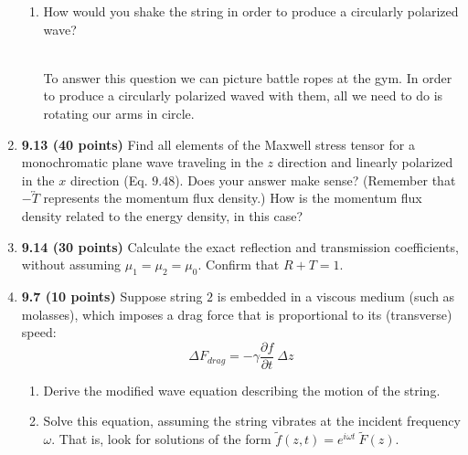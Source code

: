 \documentclass[fleqn]{article}
\begin{document}
\begin{enumerate}
\begin{enumerate}
      \item How would you shake the string in order to produce a circularly polarized wave?
      
        \textcolor{hwColor}{
          \\
          To answer this question we can picture battle ropes at the gym. In order to produce a circularly polarized waved with them, all we
          need to do is rotating our arms in circle.
          \\
        }

    \end{enumerate}


    \item \textbf{9.13 (40 points)} Find all elements of the Maxwell stress tensor for a monochromatic plane wave traveling in the 
    $z$ direction and linearly polarized in the $x$ direction (Eq. $9.48$). Does your answer make sense? (Remember that 
    $-\overleftrightarrow{T}$ represents the momentum flux density.) How is the momentum flux density related to the energy
    density, in this case?



    \item \textbf{9.14 (30 points)} Calculate the exact reflection and transmission coefficients, without assuming $\mu_1=\mu_2=\mu_0$. 
    Confirm that $R+T=1$.



    \item \textbf{9.7 (10 points)} Suppose string $2$ is embedded in a viscous medium (such as molasses), which imposes a drag force 
    that is proportional to its (transverse) speed:
    $$
      \Delta F_{drag}=-\gamma \dfrac{\partial f}{\partial t} ~ \Delta z
    $$
    \begin{enumerate}
      \item Derive the modified wave equation describing the motion of the string.


      \item Solve this equation, assuming the string vibrates at the incident frequency $\omega$. That is, look for solutions of the
      form $\tilde{f}(z,t)=e^{i \omega t} ~ \tilde{F}(z)$.


\end{enumerate}
\end{enumerate}
\end{document}

